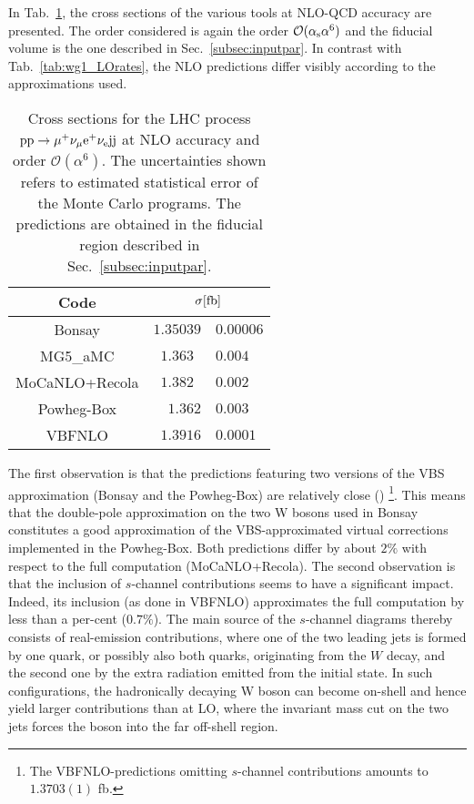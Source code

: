 In Tab.~\ref{tab:wg1_NLOrates}, the cross sections of the various tools at NLO-QCD accuracy are presented.
The order considered is again the order $\mathcal{O}(\alpha_{\rm s}\alpha^6)$ and the fiducial volume is the one described in Sec.~\ref{subsec:inputpar}.
In contrast with Tab.~\ref{tab:wg1_LOrates}, the NLO predictions differ visibly according to the approximations used.

\begin{table}[h!]
    \centering
    \begin{tabular}{c|r@{ $\pm$ }l}
      Code  &  \multicolumn{2}{c}{$\sigma[\rm{fb}]$}  \\
        \hline
        \hline
        {\sc Bonsay}  &  $1.35039$ & $0.00006$  \\
        {\sc MG5\_aMC}&  $1.363\phantom{0}$ & $0.004$  \\
        {\sc MoCaNLO+Recola}  &  $ 1.382\phantom{0}$ & $0.002$ \\
        {\sc Powheg-Box}  &  $1.362$  & $0.003$   \\
        {\sc VBFNLO}  &  $1.3916$ & $0.0001$  \\
    \end{tabular}
    \caption{\label{tab:wg1_NLOrates} Cross sections for the LHC process ${\rm p}{\rm p}\to\mu^+\nu_\mu{\rm e}^+\nu_{\rm e}{\rm j}{\rm j}$ at NLO accuracy and order $\mathcal{O}(\alpha^6)$.
    The uncertainties shown refers to estimated statistical error of the Monte Carlo programs.
    The predictions are obtained in the fiducial region described in Sec.~\ref{subsec:inputpar}.
    }
\end{table}

The first observation is that the predictions featuring two versions of the VBS approximation ({\sc Bonsay} and the {\sc Powheg-Box}) are relatively close ()
\footnote{The {\sc VBFNLO}-predictions omitting $s$-channel contributions amounts to $1.3703(1)$ fb.}.
This means that the double-pole approximation on the two W bosons used in {\sc Bonsay} constitutes a good approximation of the VBS-approximated virtual corrections implemented in the {\sc Powheg-Box}.
Both predictions differ by about $2\%$ with respect to the full computation ({\sc MoCaNLO+Recola}).
The second observation is that the inclusion of $s$-channel contributions seems to have a significant impact.
Indeed, its inclusion (as done in {\sc VBFNLO}) approximates the full computation by less than a per-cent ($0.7\%$).
The main source of the $s$-channel diagrams thereby consists of
real-emission contributions, where one of the two leading jets is formed
by one quark, or possibly also both quarks, originating from the $W$
decay, and the second one by the extra radiation emitted from the
initial state. In such configurations, the hadronically decaying W boson
can become on-shell and hence yield larger contributions than at LO, where the
invariant mass cut on the two jets forces the boson into the far
off-shell region.
